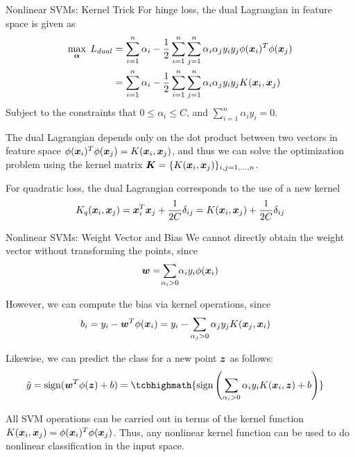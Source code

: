 \begin{frame}{Nonlinear SVMs: Kernel Trick}
For hinge loss, the dual Lagrangian in feature space is given as
\begin{align*}
    \max_{{\bm \alpha}} \; L_{dual} & = \displaystyle \sum_{i=1}^n\alpha_{i} - {1 \over 2} \displaystyle \sum_{i=1}^n
  \displaystyle \sum_{j=1}^n \alpha_i\alpha_{j} y_i y_{j} \phi({\boldsymbol x}_i)^T
  \phi({\boldsymbol x}_{j})\\
  & =  \displaystyle \sum_{i=1}^n\alpha_{i} - {1 \over 2} \displaystyle \sum_{i=1}^n
  \displaystyle \sum_{j=1}^n \alpha_i\alpha_{j} y_i y_{j} K({\boldsymbol x}_i,{\boldsymbol x}_{j})
\end{align*}
Subject to the constraints that $0 \le \alpha_i \le C$, and
$\sum_{i=1}^n \alpha_i y_i = 0$.

\medskip
The dual Lagrangian depends only on the
dot product between two vectors in feature space
$\phi({\boldsymbol x}_i)^T \phi({\boldsymbol x}_{j})= K({\boldsymbol x}_i,{\boldsymbol x}_{j})$, and thus we can
solve the optimization problem using the kernel matrix ${\boldsymbol K} =
\{K({\boldsymbol x}_i, {\boldsymbol x}_{j}) \}_{i,j=1,\ldots,n}$.


\medskip 
For quadratic loss,
the dual Lagrangian
corresponds to the use of a new kernel
\begin{align*}
    K_q({\boldsymbol x}_i, {\boldsymbol x}_{j}) = {\boldsymbol x}_i^T{\boldsymbol x}_{j} + {1\over 2C}\delta_{ij}
    = K({\boldsymbol x}_i, {\boldsymbol x}_{j}) + {1\over 2C}\delta_{ij}
\end{align*}
\end{frame}



\begin{frame}{Nonlinear SVMs: Weight Vector and Bias}
We cannot directly obtain the weight vector without transforming the
points, since
\begin{align*}
    \bw  =  \dsum_{\mathclap{\alpha_i>0}} \alpha_i y_i \phi(\bx_i)
\end{align*}


However, we can compute the bias via kernel operations, since
\begin{align*}
    b_i  & =  y_i - {\boldsymbol w}^T\phi({\boldsymbol x}_i) = 
     y_i - \displaystyle \sum_{\alpha_{j} >0} \alpha_{j} y_{j}
    K({\boldsymbol x}_{j},{\boldsymbol x}_i)
\end{align*}

Likewise, we can 
predict the class for a new point ${\boldsymbol z}$ as follows:
\begin{align*}
  \hat{y}  & =  \sign(\bw^T\phi(\bz) + b)
         =  
\tcbhighmath{ 
\sign\lB(\sum_{\alpha_i> 0} \alpha_i y_i K(\bx_i,\bz) + b\rB)
}
\end{align*}

All SVM operations can be carried out in
terms of the kernel function $K({\boldsymbol x}_i, {\boldsymbol x}_{j}) =
\phi({\boldsymbol x}_i)^T\phi({\boldsymbol x}_{j})$. 
Thus, any nonlinear kernel function can be used to
do nonlinear classif\/{i}cation in the input space.

\end{frame}



